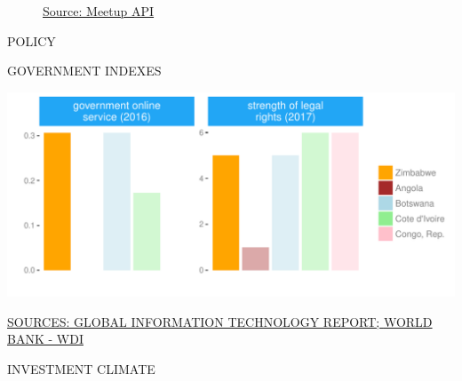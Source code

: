 \documentclass{article}\usepackage[]{graphicx}\usepackage[]{color}
\makeatletter
\def\maxwidth{ %
  \ifdim\Gin@nat@width>\linewidth
    \linewidth
  \else
    \Gin@nat@width
  \fi
}
\makeatother
\begin{document}
\begin{figure}
\begin{minipage}[t]{0.99\textwidth}
\begin{minipage}[t]{0.56\textwidth}
\begin{minipage}[c]{0.30\textwidth}
{}



    \vspace{-2ex}
    \hspace{2ex}\tiny{\href{http://www.meetup.com/en-US/meetup_api/}{\textcolor[HTML]{22A6F5}{Source: Meetup API}}}
    \end{minipage}
  \end{minipage}
\end{minipage}
\end{figure}

\begin{minipage}[c]{0.95\textwidth}
  \begin{flushleft}  
    \hspace{4ex}\Large{\textcolor[HTML]{22A6F5}{POLICY}}
  \end{flushleft}
  \begin{minipage}[c]{0.55\textwidth}
    \hspace{4ex}\small{\textcolor[HTML]{818181}{GOVERNMENT INDEXES}}
    \vspace{1ex}


\hfill{}\includegraphics[width=\maxwidth]{figure/bar_facewrap_chart_Policy-1} 



   \hspace{4ex}\scriptsize{\href{http://www3.weforum.org/docs/WEF_NRI_2012-2015_Historical_Dataset.xlsx}{\textcolor[HTML]{22A6F5}{SOURCES: GLOBAL INFORMATION TECHNOLOGY REPORT; }}\href{http://data.worldbank.org}{\textcolor[HTML]{22A6F5}{WORLD BANK - WDI}}}
  \end{minipage}
  \begin{minipage}[c]{0.43\textwidth}
    \small{\textcolor[HTML]{818181}{INVESTMENT CLIMATE}}
    \vspace{1ex}



\end{minipage}
\end{minipage}
\end{document}
